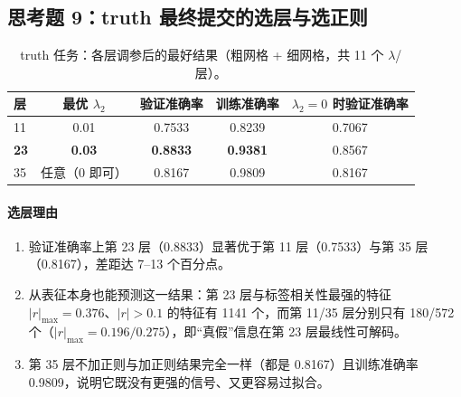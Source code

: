 \documentclass[UTF8,a4paper]{ctexart}
\begin{document}
\subsection{思考题 9：truth 最终提交的选层与选正则}

\begin{table}[htbp]
\centering
\caption{truth 任务：各层调参后的最好结果（粗网格 + 细网格，共 11 个 $\lambda$/层）。}
\label{tab:layer_truth}
\begin{tabular}{lcccc}
\toprule
层 & 最优 $\lambda_2$ & 验证准确率 & 训练准确率 & $\lambda_2=0$ 时验证准确率 \\
\midrule
11 & 0.01 & 0.7533 & 0.8239 & 0.7067 \\
\textbf{23} & \textbf{0.03} & \textbf{0.8833} & \textbf{0.9381} & 0.8567 \\
35 & 任意（0 即可） & 0.8167 & 0.9809 & 0.8167 \\
\bottomrule
\end{tabular}
\end{table}

\paragraph{选层理由}
\begin{enumerate}
  \item 验证准确率上第 23 层（0.8833）显著优于第 11 层（0.7533）与第 35 层
  （0.8167），差距达 7--13 个百分点。
  \item 从表征本身也能预测这一结果：第 23 层与标签相关性最强的特征
  $|r|_{\max}=0.376$、$|r|>0.1$ 的特征有 1141 个，而第 11/35 层分别只有
  180/572 个（$|r|_{\max}=0.196/0.275$），即“真假”信息在第 23 层最线性可解码。
  \item 第 35 层不加正则与加正则结果完全一样（都是 0.8167）且训练准确率
  0.9809，说明它既没有更强的信号、又更容易过拟合。
\end{enumerate}
\end{document}
